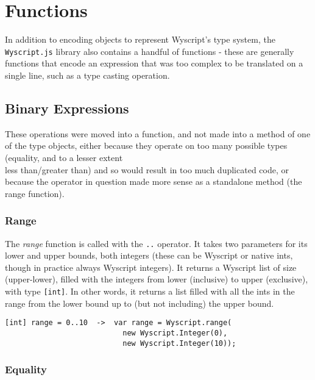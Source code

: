 \chapter{Functions}

In addition to encoding objects to represent Wyscript's type system, the \verb+Wyscript.js+ library also contains a handful of functions - these are generally functions that encode an expression that was too complex to be translated on a single line, such as a type casting operation.

\section{Binary Expressions}
\label{c_functions_binary}

These operations were moved into a function, and not made into a method of one of the type objects, either because they operate on too many possible types (equality, and to a lesser extent\\less than/greater than) and so would result in too much duplicated code, or because the operator in question made more sense as a standalone method (the range function).

\subsection{Range}
\label{c_functions_range}

The {\em range} function is called with the \lstinline{..} operator. It takes two parameters for its lower and upper bounds, both integers (these can be Wyscript or native ints, though in practice always Wyscript integers). It returns a Wyscript list of size (upper-lower), filled with the integers from lower (inclusive) to upper (exclusive), with type \lstinline{[int]}. In other words, it returns a list filled with all the ints in the range from the lower bound up to (but not including) the upper bound.

\begin{lstlisting}
[int] range = 0..10  ->  var range = Wyscript.range(
                           new Wyscript.Integer(0),
                           new Wyscript.Integer(10));
\end{lstlisting}

\subsection{Equality}
\label{c_functions_equality}

